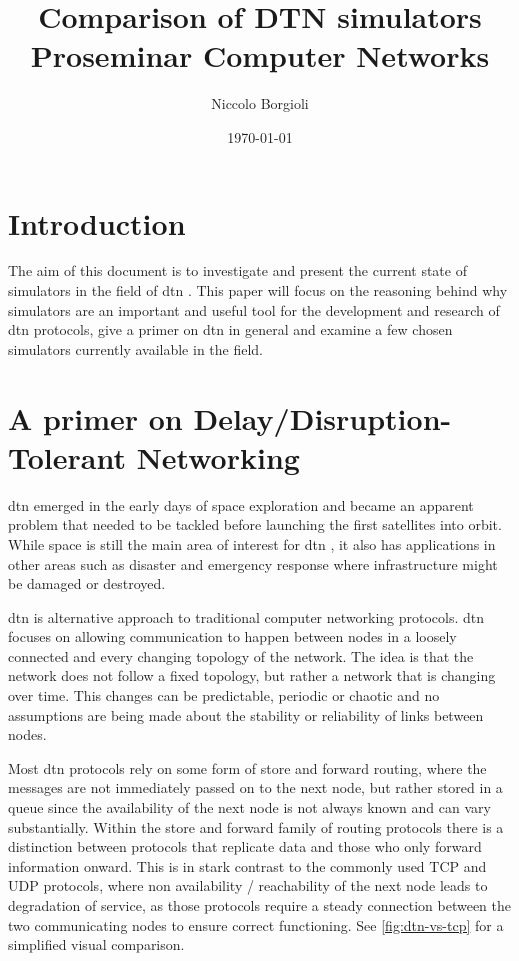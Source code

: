 \documentclass{tudscrartcl}
\newcommand{\dtn}{
  \ac{dtn}
}
\begin{document}
\author{Niccolo Borgioli}
\date{\today}
\title{Comparison of DTN simulators \\ \large Proseminar Computer Networks}
\maketitle

\tableofcontents

\section{Introduction}

The aim of this document is to investigate and present the current state of simulators in the field of \dtn. This paper will focus on the reasoning behind why simulators are an important and useful tool for the development and research of \dtn protocols, give a primer on \dtn in general and examine a few chosen simulators currently available in the field.

\section{A primer on Delay/Disruption-Tolerant Networking}

\nocite{nasa-scottburleigh-2021-1}
\nocite{nasa-scottburleigh-2021-2}

\acl{dtn} emerged in the early days of space exploration and became an apparent problem that needed to be tackled before launching the first satellites into orbit. While space is still the main area of interest for \dtn, it also has applications in other areas such as disaster and emergency response where infrastructure might be damaged or destroyed.

\dtn is alternative approach to traditional computer networking protocols. \dtn focuses on allowing communication to happen between nodes in a loosely connected and every changing topology of the network. The idea is that the network does not follow a fixed topology, but rather a network that is changing over time.
This changes can be predictable, periodic or chaotic and no assumptions are being made about the stability or reliability of links between nodes.

Most \dtn protocols rely on some form of store and forward routing, where the messages are not immediately passed on to the next node, but rather stored in a queue since the availability of the next node is not always known and can vary substantially.
Within the store and forward family of routing protocols there is a distinction between protocols that replicate data and those who only forward information onward.
This is in stark contrast to the commonly used TCP and UDP protocols, where non availability / reachability of the next node leads to degradation of service, as those protocols require a steady connection between the two communicating nodes to ensure correct functioning. See \ref{fig:dtn-vs-tcp} for a simplified visual comparison.
\end{document}
